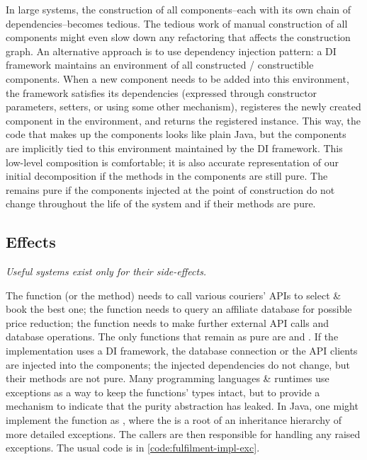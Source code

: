 In large systems, the construction of all components--each with its own chain of dependencies--becomes tedious. The tedious work of manual construction of all components might even slow down any refactoring that affects the construction graph. An alternative approach is to use dependency injection pattern: a DI framework maintains an environment of all constructed / constructible components. When a new component needs to be added into this environment, the framework satisfies its dependencies (expressed through constructor parameters, setters, or using some other mechanism), registeres the newly created component in the environment, and returns the registered instance. This way, the code that makes up the components looks like plain Java, but the components are implicitly tied to this environment maintained by the DI framework. This low-level composition is comfortable; it is also accurate representation of our initial decomposition if the methods in the components are still pure. The  remains pure if the components injected at the point of construction do not change throughout the life of the system and if their methods are pure. 

\subsection{Effects}
\emph{Useful systems exist only for their side-effects.}

The  function (or the  method) needs to call various couriers' APIs to select \& book the best one; the  function needs to query an affiliate database for possible price reduction; the  function needs to make further external API calls and database operations. The only functions that remain as pure are  and . If the implementation uses a DI framework, the database connection or the API clients are injected into the components; the injected dependencies do not change, but their methods are not pure. Many programming languages \& runtimes use exceptions as a way to keep the functions' types intact, but to provide a mechanism to indicate that the purity abstraction has leaked. In Java, one might implement the  function as , where the  is a root of an inheritance hierarchy of more detailed exceptions. The callers are then responsible for handling any raised exceptions. The usual code is in \autoref{code:fulfilment-impl-exc}.

